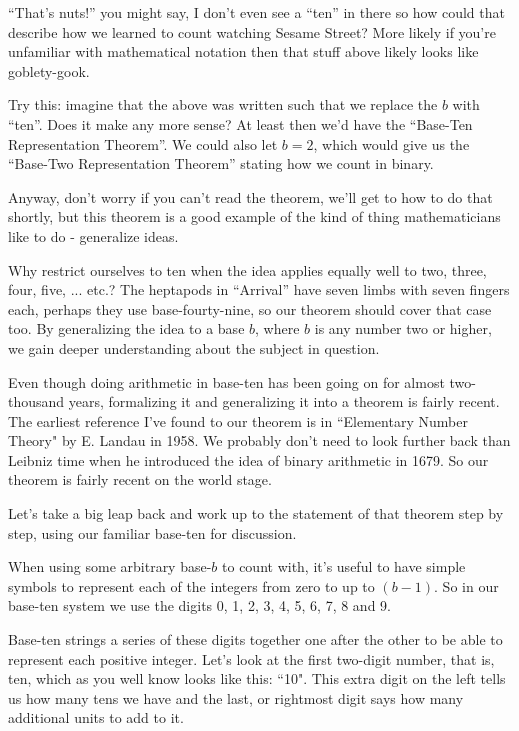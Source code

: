 \documentclass{article}
\begin{document}
``That's nuts!'' you might say, I don't even see a ``ten'' in there so how could that
describe how we learned to count watching Sesame Street? 
More likely
if you're unfamiliar with mathematical notation then that stuff above likely looks
like goblety-gook.

Try this: imagine that the above was 
written such that
we replace the $b$ with ``ten''. Does it make any more sense?
At least then we'd have the ``Base-Ten Representation Theorem''. We could also let $b=2$,
which would give us the 
``Base-Two Representation Theorem'' stating how we count in binary.

Anyway, don't worry if you can't read the theorem, we'll get to how to do that shortly, but
this theorem is a good example of the kind of thing mathematicians like to do - generalize ideas.

Why restrict ourselves to ten when the idea applies equally well to two, three, four, five, ... etc.?
The heptapods in ``Arrival'' have  seven limbs with seven fingers each, perhaps they
use base-fourty-nine, so our
theorem should cover that case too.  By generalizing the idea to a base $b$, where $b$ is any number two or higher,
we gain deeper understanding about the subject in question.

Even though doing arithmetic in base-ten
has been going on for almost two-thousand
years, formalizing it and generalizing it into a theorem is fairly recent.
The earliest reference I've found to our theorem
is in ``Elementary Number Theory" by E. Landau in 1958.
We probably don't need to look further back than
Leibniz time when he introduced the idea of binary
arithmetic in 1679. So our theorem is fairly recent 
on the world stage.


Let's take a big leap back and work up to the statement of that theorem step by step, using
our familiar base-ten for discussion.

When using some arbitrary base-$b$ to count with,
it's useful to have simple symbols to represent each of the integers from zero to up to $(b-1)$.
So in our base-ten system we use the
digits 0, 1, 2, 3, 4, 5, 6, 7, 8 and 9.

Base-ten strings a series of these digits together
one after the other to be able to represent each positive integer.
Let's look at the first two-digit number, that is, ten,
which as you well know looks like this: ``10".
This extra digit on the left tells us how many tens we have and the last,
or rightmost digit says how many additional units to add to it.
\end{document}
